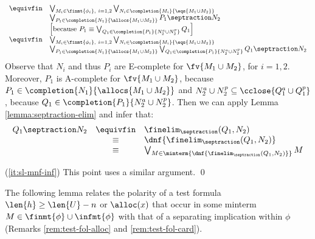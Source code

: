 {\begin{compactitem}
\[\begin{array}{rl}
  \equivfin & \bigvee_{M_i \in \finmt{\phi_i},~ i=1,2} \bigvee_{N_i \in \completion{M_i}{\eqs{M_1 \cup M_2}}} \\
  & \bigvee_{P_1 \in \completion{N_1}{\allocs{M_1 \cup M_2}}} P_1 \septraction N_2 \\
  & \left[\text{because } P_1 \equiv \bigvee_{Q_1 \in \completion{P_1}{N_2^a \cup N_2^p}} Q_1\right] \\
  \equivfin & \bigvee_{M_i \in \finmt{\phi_i},~ i=1,2} \bigvee_{N_i \in \completion{M_i}{\eqs{M_1 \cup M_2}}} \\
  & \bigvee_{P_1 \in \completion{N_1}{\allocs{M_1 \cup M_2}}} \bigvee_{Q_1 \in \completion{P_1}{N_2^a \cup N_2^p}} Q_1 \septraction N_2
  \end{array}\]
  Observe that $N_i$ and thus $P_i$ are E-complete for $\fv{M_1 \cup
    M_2}$, for $i=1,2$. Moreover, $P_1$ is A-complete for $\fv{M_1
    \cup M_2}$, because $P_1 \in \completion{N_1}{\allocs{M_1 \cup
      M_2}}$ and $N_2^a \cup N_2^p \subseteq \cclose{Q_1^a \cup
    Q_1^p}$, because $Q_1 \in \completion{P_1}{N_2^a \cup
    N_2^p}$. Then we can apply Lemma \ref{lemma:septraction-elim} and
  infer that: \[\begin{array}{rcl}
  Q_1 \septraction N_2 & \equivfin & \finelim_\septraction(Q_1,N_2) \\ 
  & \equiv & \dnf{\finelim_\septraction(Q_1,N_2)} \\
  & \equiv & \bigvee_{M \in \minterm{\dnf{\finelim_\septraction(Q_1,N_2)}}} M
  \end{array}\]
  \end{compactitem}

\vspace*{\baselineskip}\noindent (\ref{it:sl-mnf-inf}) This point uses
a similar argument. \qed
}


The following lemma relates the polarity of a test formula $\len{h}
\geq \len{U} - n$ or $\alloc(x)$ that occur in some minterm $M \in
\finmt{\phi} \cup \infmt{\phi}$ with that of a separating implication
within $\phi$ (Remarks \ref{rem:test-fol-alloc} and
\ref{rem:test-fol-card}).

